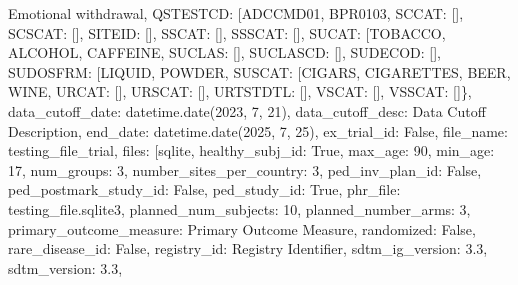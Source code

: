 \documentclass[letterpaper,10pt,english]{sphinxmanual}
\begin{document}
\begin{fulllineitems}
\begin{fulllineitems}
\sphinxhyphen{} Emotional withdrawal\textquotesingle{}{]}, \textquotesingle{}QSTESTCD\textquotesingle{}: {[}\textquotesingle{}ADCCMD01\textquotesingle{}, \textquotesingle{}BPR0103\textquotesingle{}{]}, \textquotesingle{}SCCAT\textquotesingle{}: {[}{]}, \textquotesingle{}SCSCAT\textquotesingle{}: {[}{]}, \textquotesingle{}SITEID\textquotesingle{}: {[}{]}, \textquotesingle{}SSCAT\textquotesingle{}: {[}{]}, \textquotesingle{}SSSCAT\textquotesingle{}: {[}{]}, \textquotesingle{}SUCAT\textquotesingle{}: {[}\textquotesingle{}TOBACCO\textquotesingle{}, \textquotesingle{}ALCOHOL\textquotesingle{}, \textquotesingle{}CAFFEINE\textquotesingle{}{]}, \textquotesingle{}SUCLAS\textquotesingle{}: {[}{]}, \textquotesingle{}SUCLASCD\textquotesingle{}: {[}{]}, \textquotesingle{}SUDECOD\textquotesingle{}: {[}{]}, \textquotesingle{}SUDOSFRM\textquotesingle{}: {[}\textquotesingle{}LIQUID\textquotesingle{}, \textquotesingle{}POWDER\textquotesingle{}{]}, \textquotesingle{}SUSCAT\textquotesingle{}: {[}\textquotesingle{}CIGARS\textquotesingle{}, \textquotesingle{}CIGARETTES\textquotesingle{}, \textquotesingle{}BEER\textquotesingle{}, \textquotesingle{}WINE\textquotesingle{}{]}, \textquotesingle{}URCAT\textquotesingle{}: {[}{]}, \textquotesingle{}URSCAT\textquotesingle{}: {[}{]}, \textquotesingle{}URTSTDTL\textquotesingle{}: {[}{]}, \textquotesingle{}VSCAT\textquotesingle{}: {[}{]}, \textquotesingle{}VSSCAT\textquotesingle{}: {[}{]}\}, \textquotesingle{}data\_cutoff\_date\textquotesingle{}: datetime.date(2023, 7, 21), \textquotesingle{}data\_cutoff\_desc\textquotesingle{}: \textquotesingle{}Data Cutoff Description\textquotesingle{}, \textquotesingle{}end\_date\textquotesingle{}: datetime.date(2025, 7, 25), \textquotesingle{}ex\_trial\_id\textquotesingle{}: False, \textquotesingle{}file\_name\textquotesingle{}: \textquotesingle{}testing\_file\_trial\textquotesingle{}, \textquotesingle{}files\textquotesingle{}: {[}\textquotesingle{}sqlite\textquotesingle{}{]}, \textquotesingle{}healthy\_subj\_id\textquotesingle{}: True, \textquotesingle{}max\_age\textquotesingle{}: \textquotesingle{}90\textquotesingle{}, \textquotesingle{}min\_age\textquotesingle{}: \textquotesingle{}17\textquotesingle{}, \textquotesingle{}num\_groups\textquotesingle{}: 3, \textquotesingle{}number\_sites\_per\_country\textquotesingle{}: 3, \textquotesingle{}ped\_inv\_plan\_id\textquotesingle{}: False, \textquotesingle{}ped\_postmark\_study\_id\textquotesingle{}: False, \textquotesingle{}ped\_study\_id\textquotesingle{}: True, \textquotesingle{}phr\_file\textquotesingle{}: \textquotesingle{}testing\_file.sqlite3\textquotesingle{}, \textquotesingle{}planned\_num\_subjects\textquotesingle{}: 10, \textquotesingle{}planned\_number\_arms\textquotesingle{}: 3, \textquotesingle{}primary\_outcome\_measure\textquotesingle{}: \textquotesingle{}Primary Outcome Measure\textquotesingle{}, \textquotesingle{}randomized\textquotesingle{}: False, \textquotesingle{}rare\_disease\_id\textquotesingle{}: False, \textquotesingle{}registry\_id\textquotesingle{}: \textquotesingle{}Registry Identifier\textquotesingle{}, \textquotesingle{}sdtm\_ig\_version\textquotesingle{}: \textquotesingle{}3.3\textquotesingle{}, \textquotesingle{}sdtm\_version\textquotesingle{}: \textquotesingle{}3.3\textquotesingle{}, 
\end{fulllineitems}
\end{fulllineitems}
\end{document}
